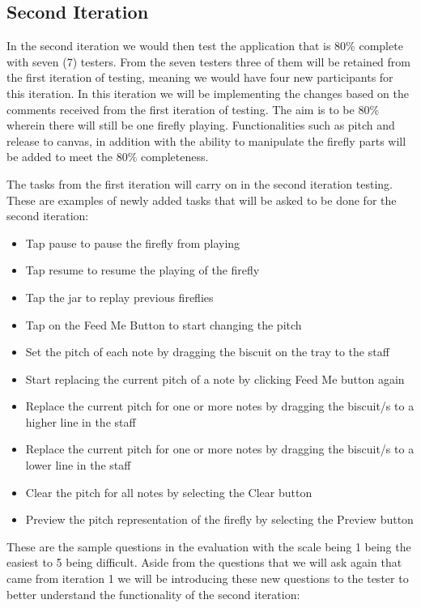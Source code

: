 \subsection{Second Iteration}
In the second iteration we would then test the application that is 80\% complete with seven (7) testers. From the seven testers three of them will be retained from the first iteration of testing, meaning we would have four new participants for this iteration. In this iteration we will be implementing the changes based on the comments received from the first iteration of testing. The aim is to be 80\% wherein there will still be one firefly playing. Functionalities such as pitch and release to canvas, in addition with the ability to manipulate the firefly parts will be added to meet the 80\% completeness.

The tasks from the first iteration will carry on in the second iteration testing. These are examples of newly added tasks that will be asked to be done for the second iteration:
\begin{itemize}
    \item Tap pause to pause the firefly from playing 
    \item Tap resume to resume the playing of the firefly
    \item Tap the jar to replay previous fireflies 
    \item Tap on the Feed Me Button to start changing the pitch
    \item Set the pitch of each note by dragging the biscuit on the tray to the staff
    \item Start replacing the current pitch of a note by clicking Feed Me button again
    \item Replace the current pitch for one or more notes by dragging the biscuit/s to a higher line in the staff
    \item Replace the current pitch for one or more notes by dragging the biscuit/s to a lower line in the staff
    \item Clear the pitch for all notes by selecting the Clear button 
    \item Preview the pitch representation of the firefly by selecting the Preview button 
\end{itemize}

These are the sample questions in the evaluation with the scale being 1 being the easiest to 5 being difficult. Aside from the questions that we will ask again that came from iteration 1 we will be introducing these new questions to the tester to better understand the functionality of the second iteration:

